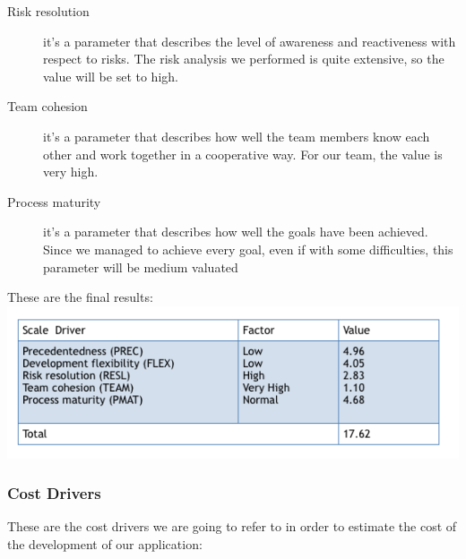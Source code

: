\documentclass{article}
\begin{document}
\begin{flushleft}
\begin{description}
\item[Risk resolution] it's a parameter that describes the level of awareness and reactiveness with respect to risks. The risk analysis we performed is quite extensive, so the value will be set to  high.
\item[Team cohesion] it's a parameter that describes how well the team members know each other and work together in a cooperative way. For our team, the value is very high.
\item[Process maturity] it's a parameter that describes how well the goals have been achieved. Since we managed to achieve every goal, even if with some difficulties, this parameter will be medium valuated
\end{description}

These are the final results:
\vspace{0.5cm}
\includegraphics[scale=0.5]{cocomo/scaleValues}


\newpage
\subsubsection{Cost Drivers}%
These are the cost drivers we are going to refer to in order to estimate the cost of the development of our application:

\begin{itemize}




\end{itemize}
\end{flushleft}
\end{document}
